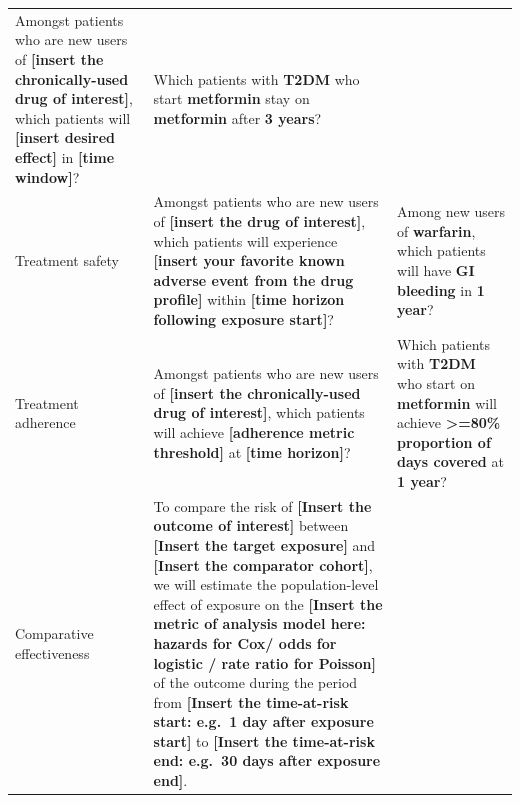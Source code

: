 \documentclass[11pt]{book}
\theoremstyle{definition}
\theoremstyle{definition}
\theoremstyle{definition}
\theoremstyle{remark}
\begin{document}
\begin{longtable}[]{@{}lll@{}}
\begin{minipage}[t]{0.30\columnwidth}
Amongst patients who are new users of \textbf{{[}insert the chronically-used drug of interest{]}}, which patients will \textbf{{[}insert desired effect{]}} in \textbf{{[}time window{]}}?\strut
\end{minipage} & \begin{minipage}[t]{0.30\columnwidth}\raggedright
Which patients with \textbf{T2DM} who start \textbf{metformin} stay on \textbf{metformin} after \textbf{3 years}?\strut
\end{minipage}\tabularnewline
\begin{minipage}[t]{0.30\columnwidth}\raggedright
Treatment safety\strut
\end{minipage} & \begin{minipage}[t]{0.30\columnwidth}\raggedright
Amongst patients who are new users of \textbf{{[}insert the drug of interest{]}}, which patients will experience \textbf{{[}insert your favorite known adverse event from the drug profile{]}} within \textbf{{[}time horizon following exposure start{]}}?\strut
\end{minipage} & \begin{minipage}[t]{0.30\columnwidth}\raggedright
Among new users of \textbf{warfarin}, which patients will have \textbf{GI bleeding} in \textbf{1 year}?\strut
\end{minipage}\tabularnewline
\begin{minipage}[t]{0.30\columnwidth}\raggedright
Treatment adherence\strut
\end{minipage} & \begin{minipage}[t]{0.30\columnwidth}\raggedright
Amongst patients who are new users of \textbf{{[}insert the chronically-used drug of interest{]}}, which patients will achieve \textbf{{[}adherence metric threshold{]}} at \textbf{{[}time horizon{]}}?\strut
\end{minipage} & \begin{minipage}[t]{0.30\columnwidth}\raggedright
Which patients with \textbf{T2DM} who start on \textbf{metformin} will achieve \textbf{\textgreater=80\% proportion of days covered} at \textbf{1 year}?\strut
\end{minipage}\tabularnewline
\begin{minipage}[t]{0.30\columnwidth}\raggedright
Comparative effectiveness\strut
\end{minipage} & \begin{minipage}[t]{0.30\columnwidth}\raggedright
To compare the risk of \textbf{{[}Insert the outcome of interest{]}} between \textbf{{[}Insert the target exposure{]}} and \textbf{{[}Insert the comparator cohort{]}}, we will estimate the population-level effect of exposure on the \textbf{{[}Insert the metric of analysis model here: hazards for Cox/ odds for logistic / rate ratio for Poisson{]}} of the outcome during the period from \textbf{{[}Insert the time-at-risk start: e.g.~1 day after exposure start{]}} to \textbf{{[}Insert the time-at-risk end: e.g.~30 days after exposure end{]}}.\strut

\end{minipage}
\end{longtable}
\end{document}
